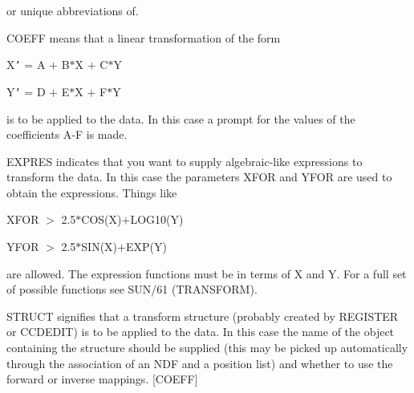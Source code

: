 {{{         
         or unique abbreviations of.

         COEFF means that a linear transformation of the form
         \begin{description}
               \item X{\tt '} = A $+$ B$*$X $+$ C$*$Y
               \item Y{\tt '} = D $+$ E$*$X $+$ F$*$Y
         \end{description}
         is to be applied to the data. In this case a prompt for the
         values of the coefficients A-F is made.

         EXPRES indicates that you want to supply algebraic-like
         expressions to transform the data. In this case the parameters
         XFOR and YFOR are used to obtain the expressions. Things like
         \begin{description}
             \item XFOR $>$ 2.5$*$COS(X)$+$LOG10(Y)
             \item YFOR $>$ 2.5$*$SIN(X)$+$EXP(Y)
         \end{description}
         are allowed. The expression functions must be in terms of X
         and Y. For a full set of possible functions see SUN/61
         (TRANSFORM).

         STRUCT signifies that a transform structure (probably created
         by REGISTER or CCDEDIT) is to be applied to the data. In this
         case the name of the object containing the structure should
         be supplied (this may be picked up automatically through the
         association of an NDF and a position list) and whether to use
         the forward or inverse mappings.
         [COEFF]
      }
      }}
